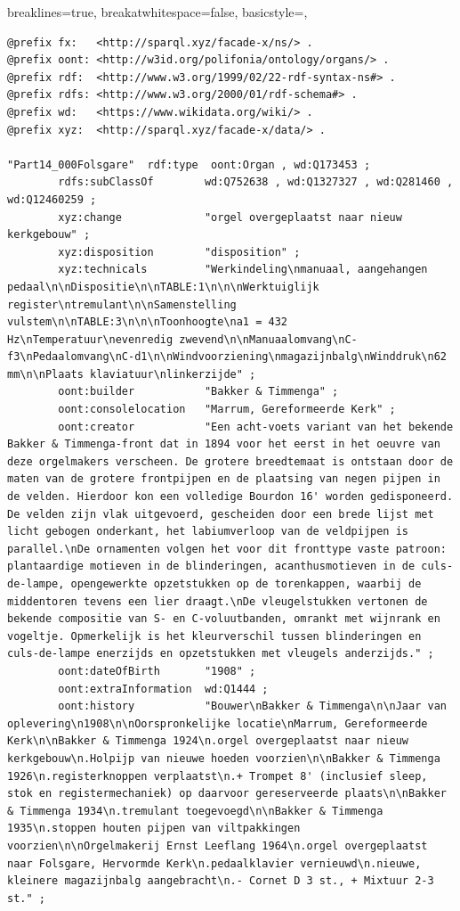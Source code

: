 \lstset
{
    breaklines=true,
    breakatwhitespace=false,
    basicstyle=\linespread{1}\ttfamily,
}
\begin{lstlisting}[caption={Part14\_000Folsgare}]
@prefix fx:   <http://sparql.xyz/facade-x/ns/> .
@prefix oont: <http://w3id.org/polifonia/ontology/organs/> .
@prefix rdf:  <http://www.w3.org/1999/02/22-rdf-syntax-ns#> .
@prefix rdfs: <http://www.w3.org/2000/01/rdf-schema#> .
@prefix wd:   <https://www.wikidata.org/wiki/> .
@prefix xyz:  <http://sparql.xyz/facade-x/data/> .

"Part14_000Folsgare"  rdf:type  oont:Organ , wd:Q173453 ;
        rdfs:subClassOf        wd:Q752638 , wd:Q1327327 , wd:Q281460 , wd:Q12460259 ;
        xyz:change             "orgel overgeplaatst naar nieuw kerkgebouw" ;
        xyz:disposition        "disposition" ;
        xyz:technicals         "Werkindeling\nmanuaal, aangehangen pedaal\n\nDispositie\n\nTABLE:1\n\n\nWerktuiglijk register\ntremulant\n\nSamenstelling vulstem\n\nTABLE:3\n\n\nToonhoogte\na1 = 432 Hz\nTemperatuur\nevenredig zwevend\n\nManuaalomvang\nC-f3\nPedaalomvang\nC-d1\n\nWindvoorziening\nmagazijnbalg\nWinddruk\n62 mm\n\nPlaats klaviatuur\nlinkerzijde" ;
        oont:builder           "Bakker & Timmenga" ;
        oont:consolelocation   "Marrum, Gereformeerde Kerk" ;
        oont:creator           "Een acht-voets variant van het bekende Bakker & Timmenga-front dat in 1894 voor het eerst in het oeuvre van deze orgelmakers verscheen. De grotere breedtemaat is ontstaan door de maten van de grotere frontpijpen en de plaatsing van negen pijpen in de velden. Hierdoor kon een volledige Bourdon 16' worden gedisponeerd. De velden zijn vlak uitgevoerd, gescheiden door een brede lijst met licht gebogen onderkant, het labiumverloop van de veldpijpen is parallel.\nDe ornamenten volgen het voor dit fronttype vaste patroon: plantaardige motieven in de blinderingen, acanthusmotieven in de culs-de-lampe, opengewerkte opzetstukken op de torenkappen, waarbij de middentoren tevens een lier draagt.\nDe vleugelstukken vertonen de bekende compositie van S- en C-voluutbanden, omrankt met wijnrank en vogeltje. Opmerkelijk is het kleurverschil tussen blinderingen en culs-de-lampe enerzijds en opzetstukken met vleugels anderzijds." ;
        oont:dateOfBirth       "1908" ;
        oont:extraInformation  wd:Q1444 ;
        oont:history           "Bouwer\nBakker & Timmenga\n\nJaar van oplevering\n1908\n\nOorspronkelijke locatie\nMarrum, Gereformeerde Kerk\n\nBakker & Timmenga 1924\n.orgel overgeplaatst naar nieuw kerkgebouw\n.Holpijp van nieuwe hoeden voorzien\n\nBakker & Timmenga 1926\n.registerknoppen verplaatst\n.+ Trompet 8' (inclusief sleep, stok en registermechaniek) op daarvoor gereserveerde plaats\n\nBakker & Timmenga 1934\n.tremulant toegevoegd\n\nBakker & Timmenga 1935\n.stoppen houten pijpen van viltpakkingen voorzien\n\nOrgelmakerij Ernst Leeflang 1964\n.orgel overgeplaatst naar Folsgare, Hervormde Kerk\n.pedaalklavier vernieuwd\n.nieuwe, kleinere magazijnbalg aangebracht\n.- Cornet D 3 st., + Mixtuur 2-3 st." ;

\end{lstlisting}
